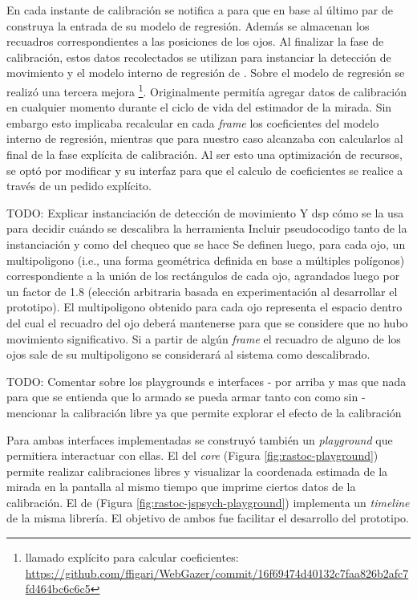 En cada instante de calibración se notifica a \webgazer para que en base al
último par de \features construya la entrada de su modelo de regresión.
Además se almacenan los recuadros correspondientes a las posiciones de los
ojos.
Al finalizar la fase de calibración, estos datos recolectados se utilizan para
instanciar la detección de movimiento y el modelo interno de regresión de
\webgazer.
Sobre el modelo de regresión se realizó una tercera mejora \footnote{llamado
explícito para calcular coeficientes:
\url{https://github.com/ffigari/WebGazer/commit/16f69474d40132c7faa826b2afc7fd464bc6c6c5}}.
Originalmente \webgazer permitía agregar datos de calibración en cualquier
momento durante el ciclo de vida del estimador de la mirada.
Sin embargo esto implicaba recalcular en cada \textit{frame} los coeficientes
del modelo interno de regresión, mientras que para nuestro caso alcanzaba con
calcularlos al final de la fase explícita de calibración.
Al ser esto una optimización de recursos, se optó por modificar \webgazer y su
interfaz para que el calculo de coeficientes se realice a través de un pedido
explícito.

TODO: Explicar instanciación de detección de movimiento
      Y dsp cómo se la usa para decidir cuándo se descalibra la herramienta
      Incluir pseudocodigo tanto de la instanciación y como del chequeo que se
      hace
Se definen luego, para cada ojo, un multipoligono (i.e., una forma geométrica
definida en base a múltiples polígonos) correspondiente a la unión de los
rectángulos de cada ojo, agrandados luego por un factor de 1.8 (elección
arbitraria basada en experimentación al desarrollar el prototipo).
El multipoligono obtenido para cada ojo representa el espacio dentro del cual
el recuadro del ojo deberá mantenerse para que se considere que no hubo
movimiento significativo.
Si a partir de algún \textit{frame} el recuadro de alguno de los ojos sale de
su multipoligono se considerará al sistema como descalibrado.

TODO: Comentar sobre los playgrounds e interfaces
  - por arriba y mas que nada para que se entienda que lo armado se pueda armar
  tanto con como sin \jspsych
  - mencionar la calibración libre ya que permite explorar el efecto de la
  calibración

Para ambas interfaces implementadas se construyó también un \textit{playground}
que permitiera interactuar con ellas.
El del \textit{core} (Figura \ref{fig:rastoc-playground}) permite realizar
calibraciones libres y visualizar la coordenada estimada de la mirada en la
pantalla al mismo tiempo que imprime ciertos datos de la calibración.
El de \jspsych (Figura \ref{fig:rastoc-jspsych-playground}) implementa un
\textit{timeline} de la misma librería.
El objetivo de ambos fue facilitar el desarrollo del prototipo.

